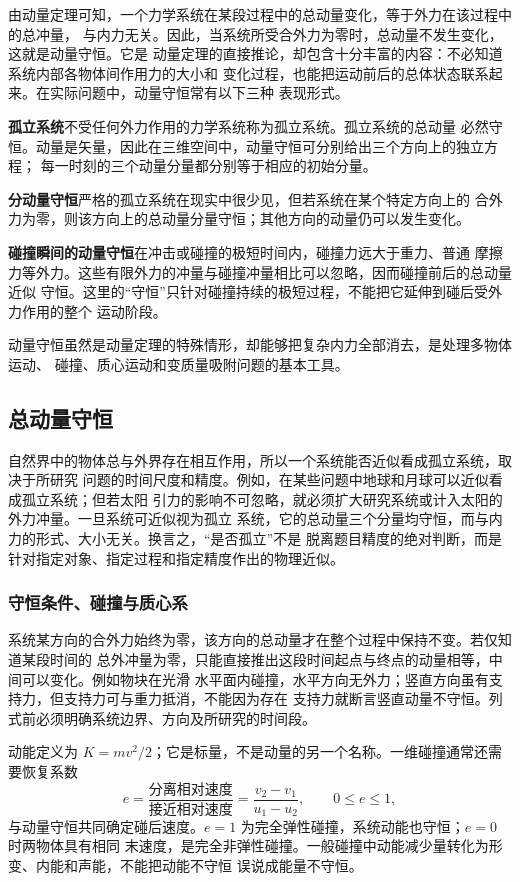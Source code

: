 {由动量定理可知，一个力学系统在某段过程中的总动量变化，等于外力在该过程中的总冲量，
与内力无关。因此，当系统所受合外力为零时，总动量不发生变化，这就是动量守恒。它是
动量定理的直接推论，却包含十分丰富的内容：不必知道系统内部各物体间作用力的大小和
变化过程，也能把运动前后的总体状态联系起来。在实际问题中，动量守恒常有以下三种
表现形式。

\textbf{孤立系统}\quad 不受任何外力作用的力学系统称为孤立系统。孤立系统的总动量
必然守恒。动量是矢量，因此在三维空间中，动量守恒可分别给出三个方向上的独立方程；
每一时刻的三个动量分量都分别等于相应的初始分量。

\textbf{分动量守恒}\quad 严格的孤立系统在现实中很少见，但若系统在某个特定方向上的
合外力为零，则该方向上的总动量分量守恒；其他方向的动量仍可以发生变化。

\textbf{碰撞瞬间的动量守恒}\quad 在冲击或碰撞的极短时间内，碰撞力远大于重力、普通
摩擦力等外力。这些有限外力的冲量与碰撞冲量相比可以忽略，因而碰撞前后的总动量近似
守恒。这里的“守恒”只针对碰撞持续的极短过程，不能把它延伸到碰后受外力作用的整个
运动阶段。

动量守恒虽然是动量定理的特殊情形，却能够把复杂内力全部消去，是处理多物体运动、
碰撞、质心运动和变质量吸附问题的基本工具。

\subsection{总动量守恒}

自然界中的物体总与外界存在相互作用，所以一个系统能否近似看成孤立系统，取决于所研究
问题的时间尺度和精度。例如，在某些问题中地球和月球可以近似看成孤立系统；但若太阳
引力的影响不可忽略，就必须扩大研究系统或计入太阳的外力冲量。一旦系统可近似视为孤立
系统，它的总动量三个分量均守恒，而与内力的形式、大小无关。换言之，“是否孤立”不是
脱离题目精度的绝对判断，而是针对指定对象、指定过程和指定精度作出的物理近似。

\subsubsection*{守恒条件、碰撞与质心系}

系统某方向的合外力始终为零，该方向的总动量才在整个过程中保持不变。若仅知道某段时间的
总外冲量为零，只能直接推出这段时间起点与终点的动量相等，中间可以变化。例如物块在光滑
水平面内碰撞，水平方向无外力；竖直方向虽有支持力，但支持力可与重力抵消，不能因为存在
支持力就断言竖直动量不守恒。列式前必须明确系统边界、方向及所研究的时间段。

动能定义为 $K=mv^2/2$；它是标量，不是动量的另一个名称。一维碰撞通常还需要恢复系数
\begin{equation}
 e=\frac{\text{分离相对速度}}{\text{接近相对速度}}
 =\frac{v_2-v_1}{u_1-u_2},\qquad 0\leq e\leq1,
\end{equation}
与动量守恒共同确定碰后速度。$e=1$ 为完全弹性碰撞，系统动能也守恒；$e=0$ 时两物体具有相同
末速度，是完全非弹性碰撞。一般碰撞中动能减少量转化为形变、内能和声能，不能把动能不守恒
误说成能量不守恒。

}
